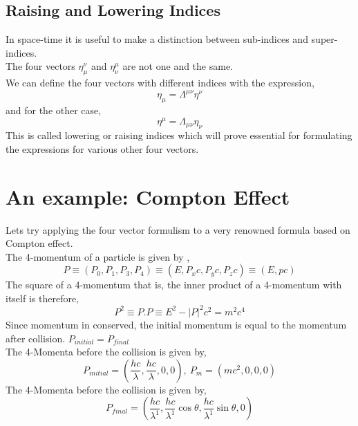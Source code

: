  \subsection{Raising and Lowering Indices}
 In space-time it is useful to make a distinction between sub-indices and super-indices. \\
 The four vectors $\eta_{\mu}^{\nu}$ and  $\eta_{\nu}^{\mu}$ are not one and the same. \\
 We can define the four vectors with different indices with the expression, 
 \begin{equation}
  \eta_{\mu} = \Lambda^{{\mu}{\nu}} \eta^{\nu}
 \end{equation}
 and for the other case, 
 \begin{equation}
     \eta^{\mu} = \Lambda_{{\mu}{\nu}} \eta_{\nu}
 \end{equation}
 This is called lowering or raising indices which will prove essential for formulating the expressions for various other four vectors. 
 \section{An example: Compton Effect}
 
 Lets try applying the four vector formulism to a very renowned formula based on Compton effect. \\
 The 4-momentum of a particle is given by ,
 \begin{equation}
    P \equiv (P_{0}, P_{1}, P_{3}, P_{4}) \equiv (E, P_{x}c, P_{y}c, P_{z}c) \equiv (E, pc)
 \end{equation}
 The square of a 4-momentum that is, the inner product of a 4-momentum with
itself is therefore,
\begin{equation}
    P^{2} \equiv P . P \equiv E^{2} - |P|^{2}c^{2}= m^{2}c^{4}
\end{equation}
Since momentum in conserved, the initial momentum is equal to the momentum after collision. $P_{initial}= P_{final}$ \\

The 4-Momenta before the collision is given by,
\begin{equation}
    P_{initial} = (\frac{hc}{\lambda}, \frac{hc}{\lambda}, 0, 0) , \: P_{m} = (mc^{2}, 0, 0, 0)
\end{equation}
The 4-Momenta before the collision is given by,
\begin{equation}
   P_{final} = (\frac{hc}{\lambda^{1}}, \frac{hc}{\lambda^{1}} \cos{\theta}, \frac{hc}{\lambda^{1}} \sin{\theta}, 0) 
\end{equation}
 
